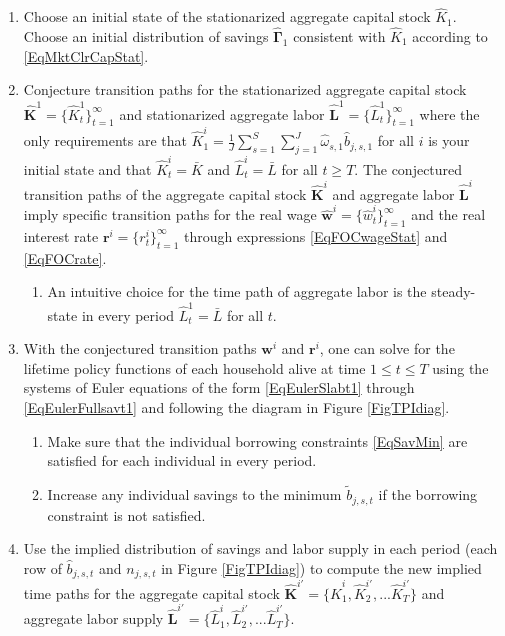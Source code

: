 \documentclass[letterpaper,12pt]{article}
\theoremstyle{definition}
\begin{document}
\begin{enumerate}
    \item Choose an initial state of the stationarized aggregate capital stock $\hat{K}_1$. Choose an initial distribution of savings $\bm{\hat{\Gamma}}_1$ consistent with $\hat{K}_1$ according to \eqref{EqMktClrCapStat}.
    \item Conjecture transition paths for the stationarized aggregate capital stock $\bm{\hat{K}}^1=\{\hat{K}^1_t\}_{t=1}^\infty$ and stationarized aggregate labor $\bm{\hat{L}}^1=\{\hat{L}^1_t\}_{t=1}^\infty$ where the only requirements are that $\hat{K}^i_1=\frac{1}{J}\sum_{s=1}^{S}\sum_{j=1}^{J}\hat{\omega}_{s,1}\hat{b}_{j,s,1}$ for all $i$ is your initial state and that $\hat{K}^i_t=\bar{K}$ and $\hat{L}^i_t=\bar{L}$ for all $t\geq T$. The conjectured transition paths of the aggregate capital stock $\bm{\hat{K}}^i$ and aggregate labor $\bm{\hat{L}}^i$ imply specific transition paths for the real wage $\bm{\hat{w}}^i=\{\hat{w}^i_t\}_{t=1}^\infty$ and the real interest rate $\bm{r}^i=\{r^i_t\}_{t=1}^\infty$ through expressions \eqref{EqFOCwageStat} and \eqref{EqFOCrate}.
      \begin{enumerate}
        \item An intuitive choice for the time path of aggregate labor is the steady-state in every period $\hat{L}^1_t = \bar{L}$ for all $t$.
      \end{enumerate}
    \item With the conjectured transition paths $\bm{w}^i$ and $\bm{r}^i$, one can solve for the lifetime policy functions of each household alive at time $1\leq t\leq T$ using the systems of Euler equations of the form \eqref{EqEulerSlabt1} through \eqref{EqEulerFullsavt1} and following the diagram in Figure \ref{FigTPIdiag}.
      \begin{enumerate}
        \item Make sure that the individual borrowing constraints \eqref{EqSavMin} are satisfied for each individual in every period.
        \item Increase any individual savings to the minimum $\tilde{b}_{j,s,t}$ if the borrowing constraint is not satisfied.
      \end{enumerate}
    \item Use the implied distribution of savings and labor supply in each period (each row of $\hat{b}_{j,s,t}$ and $n_{j,s,t}$ in Figure \ref{FigTPIdiag}) to compute the new implied time paths for the aggregate capital stock $\bm{\hat{K}}^{i'} = \{\hat{K}_1^i,\hat{K}_2^{i'},...\hat{K}_T^{i'}\}$ and aggregate labor supply $\bm{\hat{L}}^{i'} = \{\hat{L}_1^i,\hat{L}_2^{i'},...\hat{L}_T^{i'}\}$.

\end{enumerate}
\end{document}
